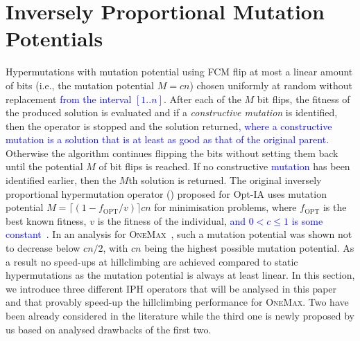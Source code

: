 \documentclass[lettersize,journal]{IEEEtran}
\newcommand{\new}[1]{\textcolor{blue}{#1}}
\begin{document}
\begin{table}[t!]
\begin{center}
{\begin{tabular}{ |l l l l l| }
			\hline
		\end{tabular}
	}
	
\end{center}
\label{table:afl}
\end{table}







 
 
 
 \section{Inversely Proportional Mutation Potentials} %
 Hypermutations with mutation potential using FCM flip at most a linear amount of bits (i.e., the mutation potential $M=cn$) chosen uniformly at random without replacement \new{from the interval $[1..n]$}. After each of the $M$ bit flips, the fitness of the produced solution is evaluated and if a {\it constructive mutation} is identified, then the operator is stopped and the solution returned\new{, where a  constructive mutation is a solution that is at least as good as that of the original parent.}
 Otherwise the algorithm continues flipping the bits without setting them back until the potential $M$ of bit flips is reached. If no constructive \new{mutation} has been identified earlier, then the $M$th solution is returned.  
 The original inversely proportional hypermutation operator (\IPHfcm{}) proposed for Opt-IA uses mutation potential  $M=\lceil(1-f_{\text{OPT}}/v)\rceil cn$ for minimisation problems, where $f_{\text{OPT}}$ is the best known fitness, $v$ is the fitness of the individual, 
 \new{and $0<c\leq 1$ is some constant}~\cite{CutelloNicosiaPavoneTimmis2007,JansenZarges2011}. 
 In an analysis for \textsc {OneMax}~\cite{JansenZarges2011}, such a mutation potential was shown not to decrease below $cn/2$, with $cn$ being the highest possible mutation potential.
 	As a result no speed-ups at hillclimbing are achieved compared to static hypermutations as the mutation potential is always at least linear.
 In this section, we introduce three different IPH operators  that will be analysed in this paper and that provably speed-up the hillclimbing  performance for \textsc{OneMax}. Two have been already considered in the literature %
 while the third one is newly proposed by us based on analysed drawbacks of the first two.
 
\end{document}
